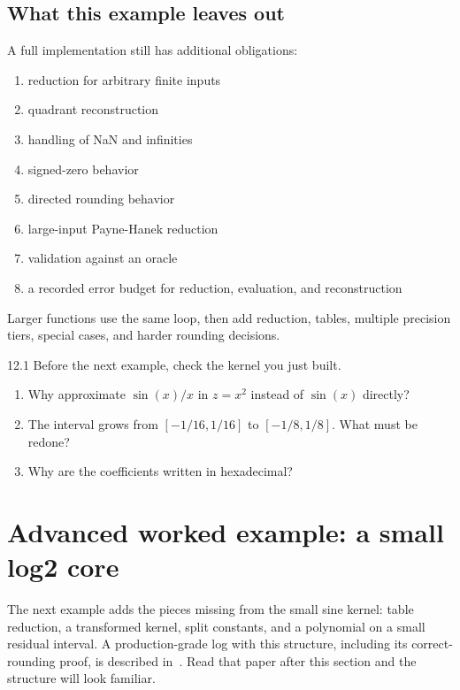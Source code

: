 \documentclass[manuscript, nonacm]{acmart}
\begin{document}
    \subsection{What this example leaves out}

    A full implementation still has additional obligations:

    \begin{enumerate}
        \item reduction for arbitrary finite inputs
        \item quadrant reconstruction
        \item handling of NaN and infinities
        \item signed-zero behavior
        \item directed rounding behavior
        \item large-input Payne-Hanek reduction
        \item validation against an oracle
        \item a recorded error budget for reduction, evaluation, and reconstruction
    \end{enumerate}

    Larger functions use the same loop, then add reduction, tables, multiple
    precision tiers, special cases, and harder rounding decisions.

    \begin{checkpoint}{12.1}
        Before the next example, check the kernel you just built.
        \begin{enumerate}
            \item Why approximate $\sin(x)/x$ in $z = x^2$ instead of $\sin(x)$
            directly?
            \item The interval grows from $[-1/16, 1/16]$ to $[-1/8, 1/8]$. What
            must be redone?
            \item Why are the coefficients written in hexadecimal?
        \end{enumerate}
    \end{checkpoint}



    \section{Advanced worked example: a small log2 core}
    \label{sec:log2}

    The next example adds the pieces missing from the small sine kernel: table
    reduction, a transformed kernel, split constants, and a polynomial on a small
    residual interval. A production-grade log with this structure,
    including its correct-rounding proof, is described in~\cite{dinechinlog}.
    Read that paper after this section and the structure will look familiar.
\end{document}
